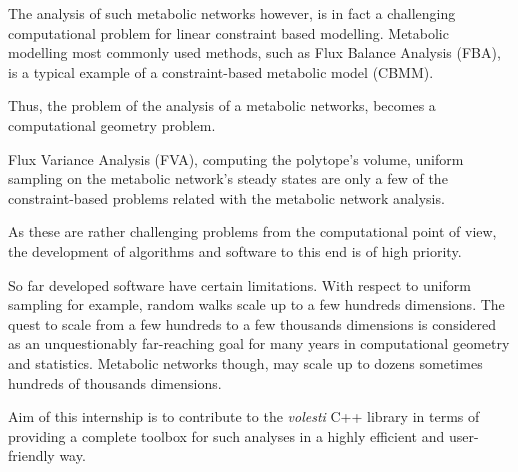 \documentclass[a4paper, 12pt]{article}
\begin{document}
The analysis of such metabolic networks however, is in fact a challenging computational problem for linear constraint based modelling. Metabolic modelling most commonly used methods, such as Flux Balance Analysis (FBA),  is a typical example of a constraint-based metabolic model (CBMM). 

Thus, the problem of the analysis of a metabolic networks, becomes a computational geometry problem. 


Flux Variance Analysis (FVA), computing the polytope's volume, uniform sampling on the metabolic network's steady states are only a few of the constraint-based problems related with the metabolic network analysis. 

As these are rather challenging problems from the computational point of view, the development of algorithms and software to this end is of high priority.

So far developed software have certain limitations. With respect to uniform sampling for example, random walks scale up to a few hundreds dimensions. The quest to scale from a few hundreds to a few thousands dimensions is
considered as an unquestionably far-reaching goal for many years in computational geometry and statistics. Metabolic networks though, may scale up to dozens sometimes hundreds of thousands dimensions.

Aim of this internship is to contribute to the \textit{volesti} C++ library in terms of providing a complete toolbox for such analyses in a highly efficient and user-friendly way.



\end{document}
